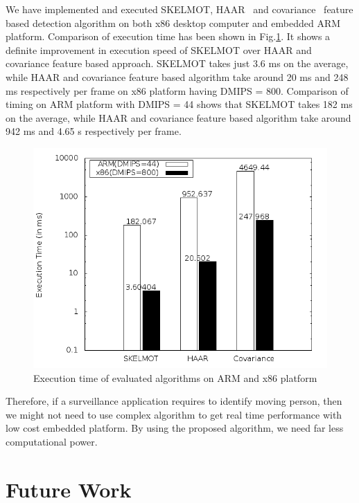 \documentclass[conference]{IEEEtran}
\begin{document}
\indent We have implemented and executed SKELMOT, HAAR~\cite{2} and
covariance~\cite{19} feature based detection algorithm on both x86
desktop computer and embedded ARM platform. Comparison of execution time
has been shown in Fig.\ref{pipeline_execution_time}. It shows a
definite improvement in execution speed of SKELMOT over HAAR and covariance
feature based approach.  SKELMOT takes just 3.6 ms on the average, while
HAAR and covariance feature based algorithm take around 20 ms and 248 ms
respectively per frame on x86 platform having DMIPS = 800. Comparison of
timing on ARM platform with DMIPS = 44 shows that SKELMOT takes 182 ms
on the average, while HAAR and covariance feature based algorithm take
around 942 ms and 4.65 s respectively per frame.  \\
\begin{figure}[!h]
\centering
\includegraphics[scale=0.30]{figures/pipeline_execution_time}
\caption{Execution time of evaluated algorithms on ARM and x86
platform}
\label{pipeline_execution_time}
\end{figure}

Therefore, if a surveillance application requires to identify moving person,
then we might not need to use complex algorithm to get real time
performance with low cost embedded platform. By using the proposed
algorithm, we need far less computational power.

\section{Future Work}
\end{document}
